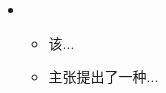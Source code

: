 \resheading{{\color{white}{ 科研经历}} }
  \begin{itemize}[leftmargin=*]


    \item
      {\small
      \begin{itemize}
        \item 该...
        \item 主张提出了一种...
      \end{itemize}
      }
      
      
      
\end{itemize}